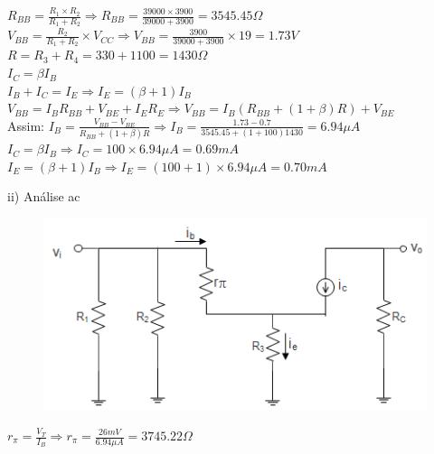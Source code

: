 \documentclass[11pt,a4paper,twoside]{report}
\begin{document}
\begin{enumerate}
\begin{minipage}[c]{2.5cm}
\begin{figure}[H]
\caption{}
\label{f4}
\end{figure}
\end{minipage}\hfill
\begin{minipage}[c]{11cm}
{$R_{BB}=\frac{R_1\times R_2}{R_1+R_2}\Longrightarrow R_{BB}=\frac{39000\times 3900}{39000+3900}=3545.45\Omega$\\

$V_{BB}=\frac{R_2}{R_1+R_2}\times V_{CC}\Longrightarrow V_{BB}=\frac{3900}{39000+3900}\times 19 = 1.73 V$\\

$R=R_3+R_4=330+1100=1430\Omega$\\

$I_C=\beta I_B$\\
$I_B+I_C=I_E \Longrightarrow I_E=(\beta +1)I_B$\\

$V_{BB}=I_BR_{BB}+V_{BE}+I_ER_E\Longrightarrow V_{BB}=I_B\left( R_{BB}+(1+\beta)R\right)+ V_{BE}$\\

Assim: $I_B=\frac{V_{BB}-V_{BE}}{R_{BB}+(1+\beta)R}\Longrightarrow I_B=\frac{1.73-0.7}{3545.45+(1+100)1430}=6.94\mu A$\\

$I_C=\beta I_B\Longrightarrow I_C=100\times 6.94\mu A =0.69 mA$\\

$I_E=(\beta +1)I_B \Longrightarrow I_E=(100 +1)\times6.94\mu A= 0.70mA$
}
\end{minipage}

\hrulefill

ii) An\'alise ac

\noindent
\begin{minipage}[c]{5cm}
\begin{figure}[H]
\centering
\includegraphics[scale=0.65]{analiseac}
\caption{}
\label{f4}
\end{figure}
\end{minipage}\hfill
\begin{minipage}[c]{8cm}
{$r_{\pi}=\frac{V_T}{I_B}\Longrightarrow r_{\pi}=\frac{26mV}{6.94\mu A}=3745.22\Omega
 $\\

}
\end{minipage}
\end{enumerate}
\end{document}

